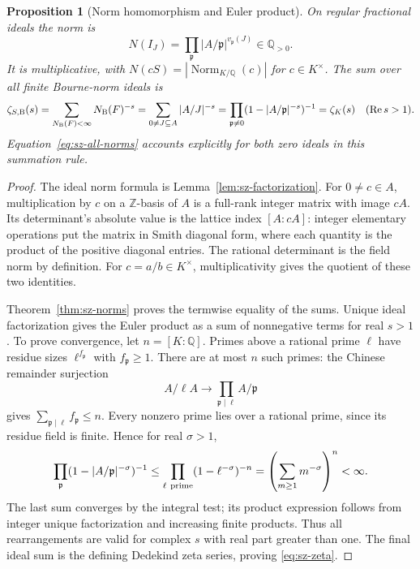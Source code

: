 \documentclass[11pt,a4paper]{article}
\newtheorem{proposition}[theorem]{Proposition}
\theoremstyle{definition}\newtheorem{definition}[theorem]{Definition}
\begin{document}
\begin{proposition}[Norm homomorphism and Euler product]\label{prop:sz-zeta}
On regular fractional ideals the norm is
\[
 N(I_J)=\prod_{\mathfrak p}|A/\mathfrak p|^{v_{\mathfrak p}(J)}
 \in\mathbb Q_{>0}.
\]
It is multiplicative, with
\(N(cS)=|\operatorname{Norm}_{K/\mathbb Q}(c)|\) for \(c\in K^\times\).
The sum over all finite Bourne-norm ideals is
\begin{equation}\label{eq:sz-zeta}
 \zeta_{S,{\rm B}}(s)
 =\sum_{N_{\rm B}(F)<\infty}N_{\rm B}(F)^{-s}
 =\sum_{0\ne J\subseteq A}|A/J|^{-s}
 =\prod_{\mathfrak p\ne0}(1-|A/\mathfrak p|^{-s})^{-1}
 =\zeta_K(s)\quad(\operatorname{Re}s>1).
\end{equation}
Equation~\eqref{eq:sz-all-norms} accounts explicitly for both
zero ideals in this summation rule.
\end{proposition}
\begin{proof}
The ideal norm formula is Lemma~\ref{lem:sz-factorization}.
For \(0\ne c\in A\), multiplication by \(c\) on a \(\mathbb Z\)-basis
of \(A\) is a full-rank integer matrix with image \(cA\).
Its determinant's absolute value is the lattice index \([A:cA]\):
integer elementary operations put the matrix in Smith diagonal form,
where each quantity is the product of the positive diagonal entries.
The rational determinant is the field norm by definition.
For \(c=a/b\in K^\times\), multiplicativity gives the quotient
of these two identities.

Theorem~\ref{thm:sz-norms} proves the termwise equality of the sums.
Unique ideal factorization gives the Euler product as a sum of
nonnegative terms for real \(s>1\). To prove convergence, let
\(n=[K:\mathbb Q]\). Primes above a rational prime \(\ell\) have
residue sizes \(\ell^{f_{\mathfrak p}}\) with \(f_{\mathfrak p}\ge1\).
There are at most \(n\) such primes: the Chinese remainder surjection
\[
 A/\ell A\longrightarrow\prod_{\mathfrak p\mid\ell}A/\mathfrak p
\]
gives \(\sum_{\mathfrak p\mid\ell}f_{\mathfrak p}\le n\).
Every nonzero prime lies over a rational prime, since its residue
field is finite. Hence for real \(\sigma>1\),
\[
 \prod_{\mathfrak p}(1-|A/\mathfrak p|^{-\sigma})^{-1}
 \le\prod_{\ell\ {\rm prime}}(1-\ell^{-\sigma})^{-n}
 =\left(\sum_{m\ge1}m^{-\sigma}\right)^n<\infty.
\]
The last sum converges by the integral test; its product expression
follows from integer unique factorization and increasing finite
products. Thus all rearrangements are valid for complex \(s\)
with real part greater than one. The final ideal sum is the defining
Dedekind zeta series, proving \eqref{eq:sz-zeta}.
\end{proof}
\end{document}
